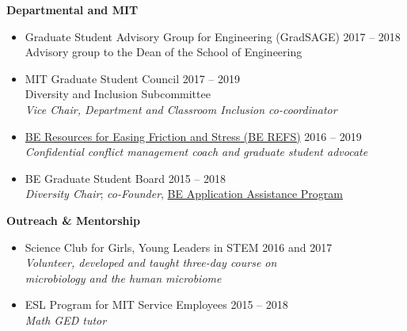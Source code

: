\documentclass[10pt]{article}
\newenvironment{outerlist}[1][\enskip\textbullet]%
        {\begin{itemize}[#1,leftmargin=*]}{\end{itemize}%
         \vspace{-.6\baselineskip}}
\begin{document}
\textbf{Departmental and MIT}
\begin{outerlist}
	\item[] Graduate Student Advisory Group for Engineering (GradSAGE) \hfill {2017 -- 2018} \\
	Advisory group to the Dean of the School of Engineering
	\item[] MIT Graduate Student Council \hfill {2017 -- 2019} \\
		Diversity and Inclusion Subcommittee  \\
		\textit{Vice Chair, Department and Classroom Inclusion co-coordinator} 
	\item[] \href{http://berefs.com/}{BE Resources for Easing Friction and Stress (BE REFS)} \hfill {2016 -- 2019} \\
	\textit{Confidential conflict management coach and graduate student advocate}
	\item[] BE Graduate Student Board \hfill {2015 -- 2018} \\ 
		\textit{Diversity Chair}; \textit{co-Founder}, \href{http://be.mit.edu/academic-programs/prospective-graduate/beaap}{BE Application Assistance Program} 
\end{outerlist}
\vspace{.15in}

\textbf{Outreach \& Mentorship}
\begin{outerlist}

	\item[] Science Club for Girls, Young Leaders in STEM \hfill {2016 and 2017} \\ \textit{Volunteer, developed and taught three-day course on} \\ \textit{microbiology and the human microbiome} 
\item[] ESL Program for MIT Service Employees \hfill {2015 -- 2018} \\
\textit{Math GED tutor}
\end{outerlist}
\vspace{.15in}
\end{document}
